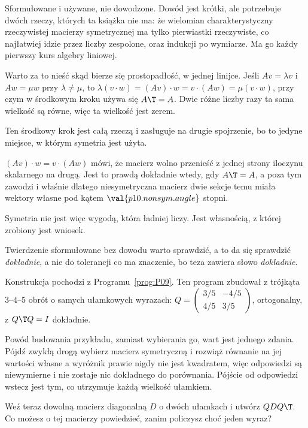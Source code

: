 \begin{rigourbox}
Sformułowane i używane, nie dowodzone. Dowód jest krótki, ale potrzebuje dwóch
rzeczy, których ta książka nie ma: że wielomian charakterystyczny rzeczywistej
macierzy symetrycznej ma tylko pierwiastki rzeczywiste, co najłatwiej idzie
przez liczby zespolone, oraz indukcji po wymiarze. Ma go każdy pierwszy kurs
algebry liniowej.

Warto za to nieść skąd bierze się prostopadłość, w jednej linijce. Jeśli
$Av = \lambda v$ i $Aw = \mu w$ przy $\lambda \ne \mu$, to
$\lambda(v \cdot w) = (Av) \cdot w = v \cdot (Aw) = \mu(v \cdot w)$, przy czym
w środkowym kroku używa się $A\T = A$. Dwie różne liczby razy ta sama wielkość
są równe, więc ta wielkość jest zerem.
\end{rigourbox}

\begin{fr}
Ten środkowy krok jest całą rzeczą i zasługuje na drugie spojrzenie, bo to
jedyne miejsce, w którym symetria jest użyta.

$(Av) \cdot w = v \cdot (Aw)$ mówi, że macierz wolno przenieść z jednej strony
iloczynu skalarnego na drugą. Jest to prawdą dokładnie wtedy, gdy $A\T = A$, a
poza tym zawodzi \dash{} i właśnie dlatego niesymetryczna macierz dwie sekcje
temu miała wektory własne pod kątem $\val{p10.nonsym.angle}$ stopni.

Symetria nie jest więc wygodą, która ładniej liczy. Jest własnością, z której
zrobiony jest wniosek.
\end{fr}

\begin{fr}
Twierdzenie sformułowane bez dowodu warto sprawdzić, a to da się sprawdzić
\emph{dokładnie}, a nie do tolerancji \dash{} co ma znaczenie, bo teza zawiera
słowo \emph{dokładnie}.

Konstrukcja pochodzi z Programu~\ref{prog:P09}. Ten program zbudował z
trójkąta $3$--$4$--$5$ obrót o samych ułamkowych wyrazach:
$Q = \begin{pmatrix} 3/5 & -4/5 \\ 4/5 & 3/5 \end{pmatrix}$, ortogonalny, z
$Q\T Q = I$ dokładnie.

Powód budowania przykładu, zamiast wybierania go, wart jest jednego zdania.
Pójdź zwykłą drogą \dash{} wybierz macierz symetryczną i rozwiąż równanie na jej
wartości własne \dash{} a wyróżnik prawie nigdy nie jest kwadratem, więc
odpowiedzi są niewymierne i nie zostaje nic dokładnego do porównania. Pójście od
odpowiedzi wstecz jest tym, co utrzymuje każdą wielkość ułamkiem.

Weź teraz dowolną macierz diagonalną $D$ o dwóch ułamkach i utwórz $Q D Q\T$.
Co możesz o tej macierzy powiedzieć, zanim policzysz choć jeden wyraz?
\dotline
\nextframe
\end{fr}

